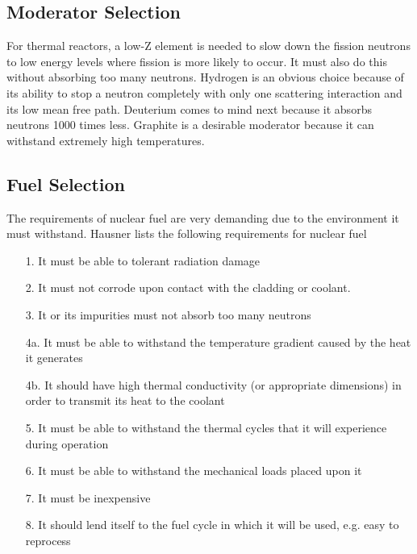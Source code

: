\subsection{Moderator Selection}
For thermal reactors, a low-Z element is needed to slow down the fission neutrons to low energy levels where fission is more likely to occur. It must also do this without absorbing too many neutrons. Hydrogen is an obvious choice because of its ability to stop a neutron completely with only one scattering interaction and its low mean free path. Deuterium comes to mind next because it absorbs neutrons 1000 times less. Graphite is a desirable moderator because it can withstand extremely high temperatures.


\subsection{Fuel Selection}
The requirements of nuclear fuel are very demanding due to the environment it must withstand. Hausner %
lists the following requirements for nuclear fuel
\begin{itemize}
\item[1.] It must be able to tolerant radiation damage
\item[2.] It must not corrode upon contact with the cladding or coolant.
\item[3.] It or its impurities must not absorb too many neutrons
\item[4a.] It must be able to withstand the temperature gradient caused by the heat it generates
\item[4b.] It should have high thermal conductivity (or appropriate dimensions) in order to transmit its heat to the coolant
\item[5.] It must be able to withstand the thermal cycles that it will experience during operation
\item[6.] It must be able to withstand the mechanical loads placed upon it
\item[7.] It must be inexpensive
\item[8.] It should lend itself to the fuel cycle in which it will be used, e.g. easy to reprocess
\end{itemize} 

